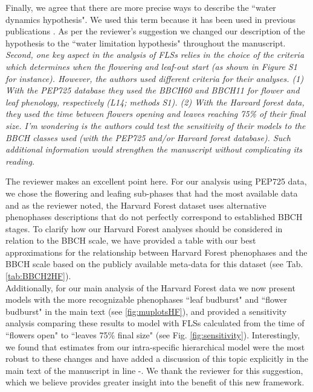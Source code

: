 \documentclass{article}[11pt]
\begin{document}
\noindent Finally, we agree that there are more precise ways to describe the ``water dynamics hypothesis". We used this term because it has been used in previous publications \citep{Gougherty2018}. As per the reviewer's suggestion we changed our description of the hypothesis to the ``water limitation hypothesis" throughout the manuscript.\\

\emph{Second, one key aspect in the analysis of FLSs relies in the choice of the criteria which determines when the flowering and leaf-out start (as shown in Figure S1 for instance). However, the authors used different criteria for their analyses. (1) With the PEP725 database they used the BBCH60 and BBCH11 for flower and leaf phenology, respectively (L14; methods S1). (2) With the Harvard forest data, they used the time between flowers opening and leaves reaching 75\% of their final size. I'm wondering is the authors could test the sensitivity of their models to the BBCH classes used (with the PEP725 and/or Harvard forest database). Such additional information would strengthen the manuscript without complicating its reading.}

\noindent The reviewer makes an excellent point here. For our analysis using PEP725 data, we chose the flowering and leafing sub-phases that had the most available data and as the reviewer noted, the Harvard Forest dataset uses alternative phenophases descriptions that do not perfectly correspond to established BBCH stages. To clarify how our Harvard Forest analyses should be considered in relation to the BBCH scale, we have provided a table with our best approximations for the relationship between Harvard Forest phenophases and the BBCH scale based on the publicly available meta-data for this dataset (see Tab. \ref{tab:BBCH2HF}).\\

\noindent Additionally, for our main analysis of the Harvard Forest data we now present models with the more recognizable phenophases ``leaf budburst" and ``flower budburst" in the main text (see \ref{fig:muplotsHF}), and provided a sensitivity analysis comparing these results to model with FLSs calculated from the time of ``flowers open" to ``leaves 75\% final size" (see Fig. \ref{fig:sensitivity}). Interestingly, we found that estimates from our intra-specific hierarchical model were the most robust to these changes and have added a discussion of this topic explicitly in the main text of the manuscript in line -. We thank the reviewer for this suggestion, which we believe provides greater insight into the benefit of this new framework. \\  
\end{document}
